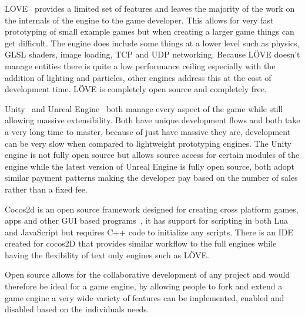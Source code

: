 \documentclass[11pt,a4paper,titlepage]{article}
\begin{document}
		LÖVE~\cite{LOVE} provides a limited set of features and leaves the majority of the work on the internals of the engine to the game developer. This allows for very fast prototyping of small example games but when creating a larger game things can get difficult. The engine does include some things at a lower level such as physics, GLSL shaders, image loading, TCP and UDP networking. Because LÖVE doesn't manage entities there is quite a low performance ceiling especially with the addition of lighting and particles, other engines address this at the cost of development time. LÖVE is completely open source and completely free.

		Unity~\cite{Unity} and Unreal Engine~\cite{UE} both manage every aspect of the game while still allowing massive extensibility. Both have unique development flows and both take a very long time to master, because of just have massive they are, development can be very slow when compared to lightweight prototyping engines. The Unity engine is not fully open source but allows source access for certain modules of the engine while the latest version of Unreal Engine is fully open source, both adopt similar payment patterns making the developer pay based on the number of sales rather than a fixed fee.
		
		Cocos2d is an open source framework designed for creating cross platform games, apps and other GUI based programs~\cite{COCOS2D}, it has support for scripting in both Lua and JavaScript but requires C++ code to initialize any scripts. There is an IDE created for cocos2D that provides similar workflow to the full engines while having the flexibility of text only engines such as LÖVE.

		Open source allows for the collaborative development of any project and would therefore be ideal for a game engine, by allowing people to fork and extend a game engine a very wide variety of features can be implemented, enabled and disabled based on the individuals needs.

	\newpage

	\printbibliography{}
\end{document}
